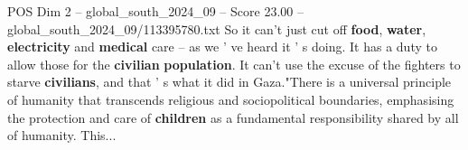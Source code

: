 \begin{textsample}{POS Dim 2 – global\_south\_2024\_09 – Score 23.00 – global\_south\_2024\_09/113395780.txt}
So it can't just cut off \textbf{food}, \textbf{water}, \textbf{electricity} and \textbf{medical} care -- as we ' ve heard it ' s doing.
It has a duty to allow those for the \textbf{civilian} \textbf{population}.
It can't use the excuse of the fighters to starve \textbf{civilians}, and that ' s what it did in Gaza."There is a universal principle of humanity that transcends religious and sociopolitical boundaries, emphasising the protection and care of \textbf{children} as a fundamental responsibility shared by all of humanity.
This...

\end{textsample}
